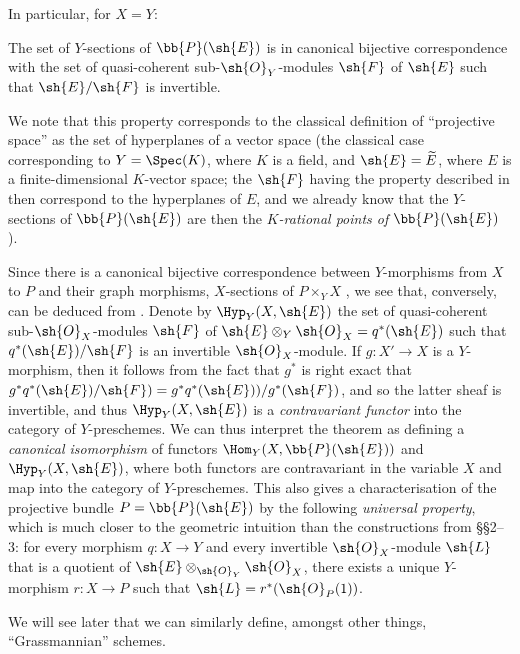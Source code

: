 In particular, for $X=Y$:
\begin{theorem}[4.2.4]
\label{II.4.2.4}
The set of $Y$-sections of $\bb{P}(\sh{E})$ is in canonical bijective correspondence with the set of quasi-coherent sub-$\sh{O}_Y$-modules $\sh{F}$ of $\sh{E}$ such that $\sh{E}/\sh{F}$ is invertible.
\end{theorem}

We note that this property corresponds to the classical definition of ``projective space'' as the set of hyperplanes of a vector space (the classical case corresponding to $Y=\Spec(K)$, where $K$ is a field, and $\sh{E}=\widetilde{E}$, where $E$ is a finite-dimensional $K$-vector space; the $\sh{F}$ having the property described in  then correspond to the hyperplanes of $E$, and we already know that the $Y$-sections of $\bb{P}(\sh{E})$ are then the \emph{$K$-rational points of $\bb{P}(\sh{E})$} ).

\begin{remark}[4.2.5]
\label{II.4.2.5}
Since there is a canonical bijective correspondence between $Y$-morphisms from $X$ to $P$ and their graph morphisms, $X$-sections of $P\times_Y X$ , we see that, conversely,  can be deduced from .
Denote by $\Hyp_Y(X,\sh{E})$ the set of quasi-coherent sub-$\sh{O}_X$-modules $\sh{F}$ of $\sh{E}\otimes_Y\sh{O}_X=q^*(\sh{E})$ such that $q^*(\sh{E})/\sh{F}$ is an invertible $\sh{O}_X$-module.
If $g:X'\to X$ is a $Y$-morphism, then it follows from the fact that $g^*$ is right exact that $g^*q^*(\sh{E})/\sh{F})=g^*q^*(\sh{E}))/g^*(\sh{F})$, and so the latter sheaf is invertible, and thus $\Hyp_Y(X,\sh{E})$ is a \emph{contravariant functor} into the category of $Y$-preschemes.
We can thus interpret the theorem  as defining a \emph{canonical isomorphism} of functors $\Hom_Y(X,\bb{P}(\sh{E}))$ and $\Hyp_Y(X,\sh{E})$, where both functors are contravariant in the variable $X$ and map into the category of $Y$-preschemes.
This also gives a characterisation of the projective bundle $P=\bb{P}(\sh{E})$ by the following \emph{universal property}, which is much closer to the geometric intuition than the constructions from §§2--3:
for every morphism $q:X\to Y$ and every invertible $\sh{O}_X$-module $\sh{L}$ that is a quotient of $\sh{E}\otimes_{\sh{O}_Y}\sh{O}_X$, there exists a unique $Y$-morphism $r:X\to P$ such that $\sh{L}=r^*(\sh{O}_P(1))$.

We will see later that we can similarly define, amongst other things, ``Grassmannian'' schemes.
\end{remark}

